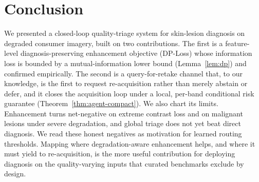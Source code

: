 \section{Conclusion}\label{sec:conclusion}
We presented a closed-loop quality-triage system for skin-lesion diagnosis on degraded
consumer imagery, built on two contributions. The first is a feature-level
diagnosis-preserving enhancement objective (DP-Loss) whose information loss is bounded by a
mutual-information lower bound (Lemma~\ref{lem:dp}) and confirmed empirically. The second is
a query-for-retake channel that, to our knowledge, is the first to request re-acquisition
rather than merely abstain or defer, and it closes the acquisition loop under a local,
per-band conditional risk guarantee (Theorem~\ref{thm:agent-compact}). We also chart its
limits. Enhancement turns net-negative on extreme contrast loss and on malignant lesions
under severe degradation, and global triage does not yet beat direct diagnosis. We read
these honest negatives as motivation for learned routing thresholds. Mapping where
degradation-aware enhancement helps, and where it must yield to re-acquisition, is the more
useful contribution for deploying diagnosis on the quality-varying inputs that curated
benchmarks exclude by design.
